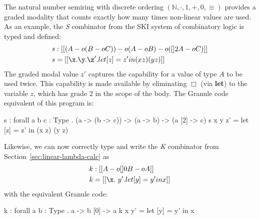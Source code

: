 \begin{example}
\label{ex:s-comb}
  The natural number semiring with discrete ordering $(\mathbb{N}, \cdot, 1, +,
  0, \equiv)$ provides a graded modality that counts exactly how many times
  non-linear values are used. As an example, the \emph{S} combinator from
  the SKI system of combinatory logic is typed and defined:
\begin{align*}
s & : [[ (A -o (B -o C)) -o {(A -o B) -o ({[] 2 A} -o C)} ]] \\
s & = [[ \x . {\y . {\z' . {let [ z ] = z' in {(x z) (y z)}}}} ]]
\end{align*}
The graded modal value $z'$ captures the capability for a value
of type $A$ to be used twice. This capability is made available by eliminating
$\Box$ (via \textbf{let}) to the variable $z$, which has
grade $2$ in the scope of the body. 
The Granule code equivalent of this program is:
\begin{granule}
s : forall { a b c : Type } 
  . (a -> (b -> c)) -> (a -> b) -> (a [2] -> c)
s x y z' = let [z] = z' in (x z) (y z)
\end{granule}
Likewise, we can now correctly type and write the \emph{K} combinator from
Section~\ref{sec:linear-lambda-calc} as 
\begin{align*}
k & : [[ {A -o [] 0 B} -o A ]] \\
k & = [[ \x . \ y' . {let [ y ] = y' in x }]]
\end{align*}
with the equivalent Granule code:
\begin{granule}
k : forall { a b : Type } . a -> b [0] -> a
k x y' = let [y] = y' in x
\end{granule}
\end{example}
